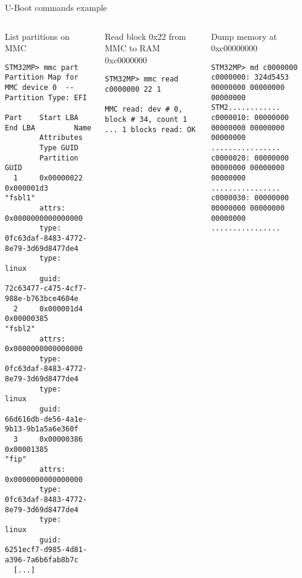 \begin{frame}[fragile]{U-Boot commands example}
  \begin{columns}
    \begin{block}{List partitions on MMC}
      {\tiny
      \begin{Verbatim}[breaklines=true, breakanywhere=true]
STM32MP> mmc part
Partition Map for MMC device 0  --   Partition Type: EFI

Part    Start LBA       End LBA         Name
        Attributes
        Type GUID
        Partition GUID
  1     0x00000022      0x000001d3      "fsbl1"
        attrs:  0x0000000000000000
        type:   0fc63daf-8483-4772-8e79-3d69d8477de4
        type:   linux
        guid:   72c63477-c475-4cf7-988e-b763bce4604e
  2     0x000001d4      0x00000385      "fsbl2"
        attrs:  0x0000000000000000
        type:   0fc63daf-8483-4772-8e79-3d69d8477de4
        type:   linux
        guid:   66d616db-de56-4a1e-9b13-9b1a5a6e360f
  3     0x00000386      0x00001385      "fip"
        attrs:  0x0000000000000000
        type:   0fc63daf-8483-4772-8e79-3d69d8477de4
        type:   linux
        guid:   6251ecf7-d985-4d81-a396-7a6b6fab8b7c
  [...]
\end{Verbatim}
      }
    \end{block}

    \begin{block}{Read block 0x22 from MMC to RAM 0xc0000000}
      {\tiny
\begin{Verbatim}[breaklines=true, breakanywhere=true]
STM32MP> mmc read c0000000 22 1

MMC read: dev # 0, block # 34, count 1 ... 1 blocks read: OK
\end{Verbatim}
      }
    \end{block}

    \begin{block}{Dump memory at 0xc00000000}
      {\tiny
\begin{Verbatim}[breaklines=true, breakanywhere=true]
STM32MP> md c0000000
c0000000: 324d5453 00000000 00000000 00000000  STM2............
c0000010: 00000000 00000000 00000000 00000000  ................
c0000020: 00000000 00000000 00000000 00000000  ................
c0000030: 00000000 00000000 00000000 00000000  ................
\end{Verbatim}
      }
    \end{block}
  \end{columns}
\end{frame}

